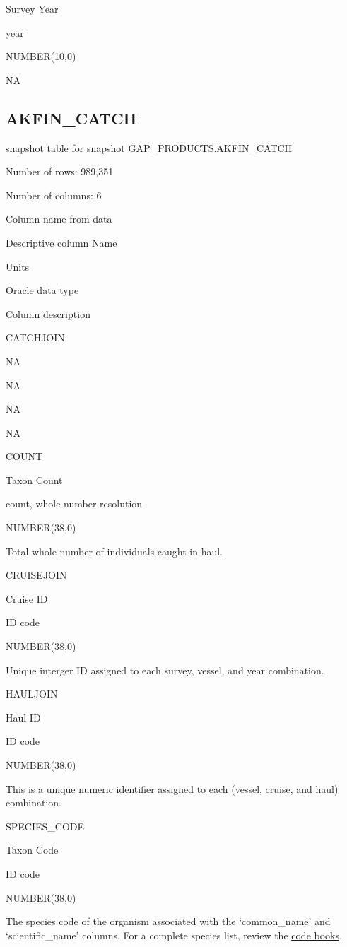 \documentclass[
  letterpaper,
  oneside,
  open=any]{scrbook}
\begin{document}
Survey Year

year

NUMBER(10,0)

NA

\hypertarget{akfin_catch}{%
\subsection{AKFIN\_CATCH}\label{akfin_catch}}

snapshot table for snapshot GAP\_PRODUCTS.AKFIN\_CATCH

Number of rows: 989,351

Number of columns: 6

Column name from data

Descriptive column Name

Units

Oracle data type

Column description

CATCHJOIN

NA

NA

NA

NA

COUNT

Taxon Count

count, whole number resolution

NUMBER(38,0)

Total whole number of individuals caught in haul.

CRUISEJOIN

Cruise ID

ID code

NUMBER(38,0)

Unique interger ID assigned to each survey, vessel, and year
combination.

HAULJOIN

Haul ID

ID code

NUMBER(38,0)

This is a unique numeric identifier assigned to each (vessel, cruise,
and haul) combination.

SPECIES\_CODE

Taxon Code

ID code

NUMBER(38,0)

The species code of the organism associated with the `common\_name' and
`scientific\_name' columns. For a complete species list, review the
\href{https://www.fisheries.noaa.gov/resource/document/groundfish-survey-species-code-manual-and-data-codes-manual}{code
books}.
\end{document}
